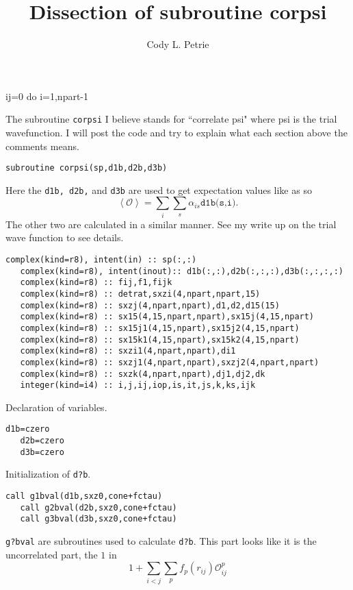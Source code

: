 \documentclass[12pt]{extarticle}
\title{Dissection of subroutine corpsi}
\author{Cody L. Petrie}
\newcommand{\Oijp}{\mathcal{O}^p_{ij}}
\newcommand{\bverb}{\begin{Verbatim}[frame=single]}
\newenvironment{blockcode}
  {\leavevmode\small\color{blue}\verbatim}
  {\endverbatim}
\begin{document}
\maketitle

\begin{blockcode}
ij=0
  do i=1,npart-1
\end{blockcode}

The subroutine \texttt{corpsi} I believe stands for ``correlate psi" where psi is the trial wavefunction. I will post the code and try to explain what each section above the comments means.

\bverb
   subroutine corpsi(sp,d1b,d2b,d3b)
\end{Verbatim}
Here the \texttt{d1b, d2b,} and \texttt{d3b} are used to get expectation values like as so
\begin{equation}
  \left< \mathcal{O} \right> = \sum_i\sum_s \alpha_{is}\texttt{d1b(s,i)}.
\end{equation}
The other two are calculated in a similar manner. See my write up on the trial wave function to see details.

\bverb
   complex(kind=r8), intent(in) :: sp(:,:)
   complex(kind=r8), intent(inout):: d1b(:,:),d2b(:,:,:),d3b(:,:,:,:)
   complex(kind=r8) :: fij,f1,fijk
   complex(kind=r8) :: detrat,sxzi(4,npart,npart,15)
   complex(kind=r8) :: sxzj(4,npart,npart),d1,d2,d15(15)
   complex(kind=r8) :: sx15(4,15,npart,npart),sx15j(4,15,npart)
   complex(kind=r8) :: sx15j1(4,15,npart),sx15j2(4,15,npart)
   complex(kind=r8) :: sx15k1(4,15,npart),sx15k2(4,15,npart)
   complex(kind=r8) :: sxzi1(4,npart,npart),di1
   complex(kind=r8) :: sxzj1(4,npart,npart),sxzj2(4,npart,npart)
   complex(kind=r8) :: sxzk(4,npart,npart),dj1,dj2,dk
   integer(kind=i4) :: i,j,ij,iop,is,it,js,k,ks,ijk

\end{Verbatim}
Declaration of variables.

\bverb
   d1b=czero
   d2b=czero
   d3b=czero
\end{Verbatim}
Initialization of \texttt{d?b}.

\bverb
   call g1bval(d1b,sxz0,cone+fctau)
   call g2bval(d2b,sxz0,cone+fctau)
   call g3bval(d3b,sxz0,cone+fctau)
\end{Verbatim}
\texttt{g?bval} are subroutines used to calculate \texttt{d?b}. This part looks like it is the uncorrelated part, the $1$ in
\begin{equation}
  1+\sum_{i<j}\sum_{p} f_p(r_{ij}) \Oijp
\end{equation}
\end{document}
